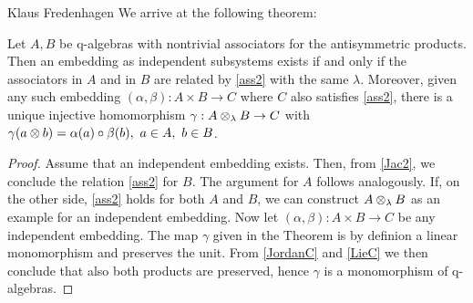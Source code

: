 \begin{artengenv}{Klaus Fredenhagen}
We arrive at the following theorem:
\begin{theorem-fred}
Let $A,B$ be q-algebras with nontrivial associators for the antisymmetric products. Then an embedding as independent subsystems exists if and only if  the associators in $A$ and in $B$ are related by \eqref{ass2} with the same $\lambda$.
 Moreover, given any such embedding $(\alpha,\beta):A\times B\to C$ where $C$ also satisfies \eqref{ass2}, there is a unique injective homomorphism $\gamma:A\otimes_{\lambda}B\to C$ with $\gamma(a\otimes b)=\alpha(a)\circ\beta(b),\ a\in A,\ b\in B$.
 \end{theorem-fred}
 \begin{proof}
 Assume that an independent embedding exists. Then, from \eqref{Jac2}, we conclude the relation \eqref{ass2} for $B$. The argument for $A$ follows analogously. If, on the other side, \eqref{ass2} holds for both $A$ and $B$, we 
 can construct $A\otimes_{\lambda} B$ as an example for an independent embedding.
 Now let $(\alpha,\beta):A\times B\to C$ be any independent embedding. The map $\gamma$ given in the Theorem is by definion a linear monomorphism and preserves the unit.  From \eqref{JordanC} and \eqref{LieC} we then conclude that also both products are preserved, hence $\gamma$ is a monomorphism of q-algebras.   
 \end{proof}






\end{artengenv}
